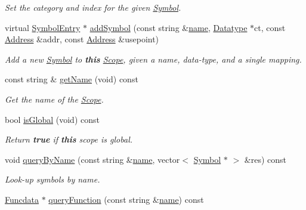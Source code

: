 \begin{DoxyCompactItemize}
\begin{DoxyCompactList}\small\item\em Set the {\itshape category} and index for the given \mbox{\hyperlink{class_symbol}{Symbol}}. \end{DoxyCompactList}\item 
virtual \mbox{\hyperlink{class_symbol_entry}{Symbol\+Entry}} $\ast$ \mbox{\hyperlink{class_scope_a7c79f7f535ba4e819fcf95185896a019}{add\+Symbol}} (const string \&\mbox{\hyperlink{class_scope_abb4900f6409e8a82c1b1cea827e4e2c5}{name}}, \mbox{\hyperlink{class_datatype}{Datatype}} $\ast$ct, const \mbox{\hyperlink{class_address}{Address}} \&addr, const \mbox{\hyperlink{class_address}{Address}} \&usepoint)
\begin{DoxyCompactList}\small\item\em Add a new \mbox{\hyperlink{class_symbol}{Symbol}} to {\bfseries{this}} \mbox{\hyperlink{class_scope}{Scope}}, given a name, data-\/type, and a single mapping. \end{DoxyCompactList}\item 
const string \& \mbox{\hyperlink{class_scope_abbc000357aa74b9dcf8bb91e17d9efb4}{get\+Name}} (void) const
\begin{DoxyCompactList}\small\item\em Get the name of the \mbox{\hyperlink{class_scope}{Scope}}. \end{DoxyCompactList}\item 
bool \mbox{\hyperlink{class_scope_a67739f460d64dd75bfd1f2391c95ee0d}{is\+Global}} (void) const
\begin{DoxyCompactList}\small\item\em Return {\bfseries{true}} if {\bfseries{this}} scope is global. \end{DoxyCompactList}\item 
void \mbox{\hyperlink{class_scope_ae7d2e4eeed5fbc77e0477936f60cfde5}{query\+By\+Name}} (const string \&\mbox{\hyperlink{class_scope_abb4900f6409e8a82c1b1cea827e4e2c5}{name}}, vector$<$ \mbox{\hyperlink{class_symbol}{Symbol}} $\ast$ $>$ \&res) const
\begin{DoxyCompactList}\small\item\em Look-\/up symbols by name. \end{DoxyCompactList}\item 
\mbox{\hyperlink{class_funcdata}{Funcdata}} $\ast$ \mbox{\hyperlink{class_scope_a6f9b49c7da91626fcb1cfacda5236991}{query\+Function}} (const string \&\mbox{\hyperlink{class_scope_abb4900f6409e8a82c1b1cea827e4e2c5}{name}}) const

\end{DoxyCompactItemize}
